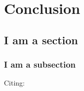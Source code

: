 \chapter{Conclusion}



\section{I am a section}



\subsection{I am a subsection}

Citing: \cite{Sample2016}


